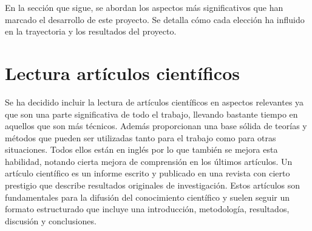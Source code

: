 En la sección que sigue, se abordan los aspectos más significativos que han marcado el desarrollo de este proyecto. Se detalla cómo cada elección ha influido en la trayectoria y los resultados del proyecto.
\section{Lectura artículos científicos}
Se ha decidido incluir la lectura de artículos científicos en aspectos relevantes ya que son una parte significativa de todo el trabajo, llevando bastante tiempo en aquellos que son más técnicos. Además proporcionan una base sólida de teorías y métodos que pueden ser utilizadas tanto para el trabajo como para otras situaciones. Todos ellos están en inglés por lo que también se mejora esta habilidad, notando cierta mejora de comprensión en los últimos artículos.
Un artículo científico es un informe escrito y publicado en una revista con cierto prestigio que describe resultados originales de investigación. Estos artículos son fundamentales para la difusión del conocimiento científico y suelen seguir un formato estructurado que incluye una introducción, metodología, resultados, discusión y conclusiones.

